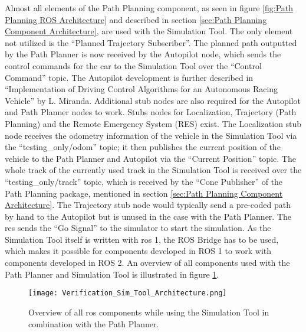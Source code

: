 Almost all elements of the Path Planning component, as seen in figure \ref{fig:Path Planning ROS Architecture} and described in section \ref{sec:Path Planning Component Architecture}, are used with the Simulation Tool. The only element not utilized is the ``Planned Trajectory Subscriber''. The planned path outputted by the Path Planner is now received by the Autopilot node, which sends the control commands for the car to the Simulation Tool over the ``Control Command'' topic. The Autopilot development is further described in ``Implementation of Driving Control Algorithms for an Autonomous Racing Vehicle'' by L. Miranda. \cite{zur_autopilot} Additional stub nodes are also required for the Autopilot and Path Planner nodes to work. Stubs nodes for Localization, Trajectory (Path Planning) and the Remote Emergency System (RES) exist. The Localization stub node receives the \gls{odometry} information of the vehicle in the Simulation Tool via the ``testing\_only/odom'' topic; it then publishes the current position of the vehicle to the Path Planner and Autopilot via the ``Current Position'' topic. The whole track of the currently used track in the Simulation Tool is received over the ``testing\_only/track'' topic, which is received by the ``Cone Publisher'' of the Path Planning package, mentioned in section \ref{sec:Path Planning Component Architecture}. The Trajectory stub node would typically send a pre-coded path by hand to the Autopilot but is unused in the case with the Path Planner. The \acrshort{res} sends the ``Go Signal'' to the simulator to start the simulation.
As the Simulation Tool itself is written with \acrshort{ros} 1, the ROS Bridge has to be used, which makes it possible for components developed in ROS 1 to work with components developed in ROS 2.
An overview of all components used with the Path Planner and Simulation Tool is illustrated in figure \ref{fig:Verification Sim Tool Architecture}.
\begin{figure}[H]
    \centering
    \texttt{[image: Verification\_Sim\_Tool\_Architecture.png]}
    \caption{Overview of all \acrshort{ros} components while using the Simulation Tool in combination with the Path Planner.}
    \label{fig:Verification Sim Tool Architecture}
\end{figure}